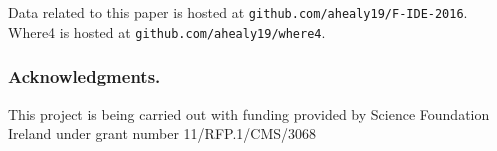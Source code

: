 \documentclass[submission,copyright,creativecommons]{eptcs}
\begin{document}
Data related to this paper is hosted at \texttt{github.com/ahealy19/F-IDE-2016}. \textsf{Where4} is hosted at \texttt{github.com/ahealy19/where4}. 

\subsubsection*{Acknowledgments.}This project is being carried out with funding provided by Science Foundation Ireland under grant number 11/RFP.1/CMS/3068



\end{document}
